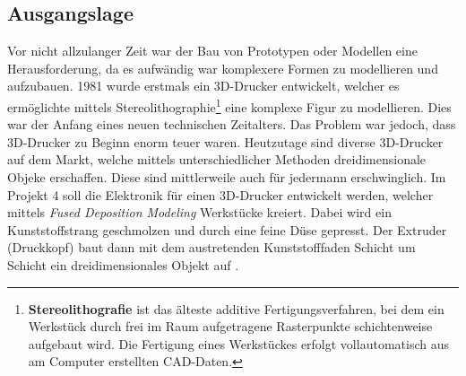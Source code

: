 
\subsection{Ausgangslage}\label{subsec:Ausgangslage}

Vor nicht allzulanger Zeit war der Bau von Prototypen oder Modellen eine Herausforderung, da es aufwändig war komplexere Formen zu modellieren und aufzubauen. 1981 wurde erstmals ein 3D-Drucker entwickelt, welcher es ermöglichte mittels Stereolithographie\footnote{\textbf{Stereolithografie} ist das älteste additive Fertigungsverfahren, bei dem ein Werkstück durch frei im Raum aufgetragene Rasterpunkte schichtenweise aufgebaut wird. Die Fertigung eines Werkstückes erfolgt vollautomatisch aus am Computer erstellten CAD-Daten.} eine komplexe Figur zu modellieren. Dies war der Anfang eines neuen technischen Zeitalters. Das Problem war jedoch, dass 3D-Drucker zu Beginn enorm teuer waren. Heutzutage sind diverse 3D-Drucker auf dem Markt, welche mittels unterschiedlicher Methoden dreidimensionale Objeke erschaffen. Diese sind mittlerweile auch für jedermann erschwinglich. Im Projekt 4 soll die Elektronik für einen 3D-Drucker entwickelt werden, welcher mittels \textit{Fused Deposition Modeling} Werkstücke kreiert. Dabei wird ein Kunststoffstrang geschmolzen und durch eine feine Düse gepresst. Der Extruder (Druckkopf) baut dann mit dem austretenden Kunststofffaden Schicht um Schicht ein dreidimensionales Objekt auf \cite{3D_Druckverfahren}\cite{Fused_Deposition_Modeling}.








